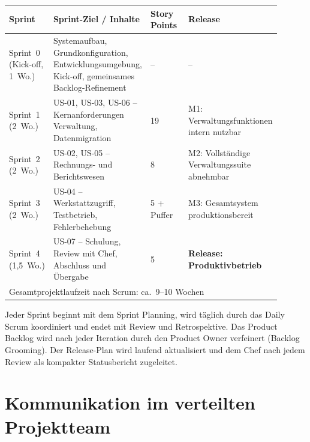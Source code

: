 \documentclass[
    a4paper,
    11pt,
    bibliography=totoc,
    listof=totoc,
    parskip=half,
    headings=normal
]{scrbook}
\begin{document}
\begin{longtable}{@{}p{0.10\linewidth}p{0.35\linewidth}p{0.18\linewidth}p{0.27\linewidth}@{}}
      \toprule
      \textbf{Sprint}            & \textbf{Sprint-Ziel / Inhalte}                                                                   & \textbf{Story Points} & \textbf{Release}                            \\
      \midrule
      \endhead
      Sprint~0 (Kick-off, 1~Wo.) & Systemaufbau, Grundkonfiguration, Entwicklungsumgebung, Kick-off, gemeinsames Backlog-Refinement & --                    & --                                          \\
      Sprint~1 (2~Wo.)           & US-01, US-03, US-06 -- Kernanforderungen Verwaltung, Datenmigration                              & 19                    & M1: Verwaltungsfunktionen intern nutzbar    \\
      Sprint~2 (2~Wo.)           & US-02, US-05 -- Rechnungs- und Berichtswesen                                                     & 8                     & M2: Vollständige Verwaltungssuite abnehmbar \\
      Sprint~3 (2~Wo.)           & US-04 -- Werkstattzugriff, Testbetrieb, Fehlerbehebung                                           & 5 + Puffer            & M3: Gesamtsystem produktionsbereit          \\
      Sprint~4 (1,5~Wo.)         & US-07 -- Schulung, Review mit Chef, Abschluss und Übergabe                                       & 5                     & \textbf{Release: Produktivbetrieb}          \\
      \bottomrule
      \multicolumn{4}{l}{\footnotesize Gesamtprojektlaufzeit nach Scrum: ca.\ 9--10 Wochen}
\end{longtable}

Jeder Sprint beginnt mit dem Sprint Planning, wird täglich durch das Daily Scrum
koordiniert und endet mit Review und Retrospektive\autocite[vgl.][Kap.~3]{Reppin2020}. Das Product Backlog wird nach jeder Iteration
durch den Product Owner verfeinert (Backlog Grooming). Der Release-Plan wird
laufend aktualisiert und dem Chef nach jedem Review als kompakter Statusbericht
zugeleitet.

\section{Kommunikation im verteilten Projektteam}
\end{document}
